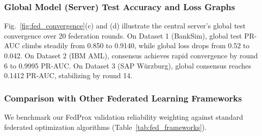 \documentclass[journal]{IEEEtran}
\begin{document}
\subsubsection{Global Model (Server) Test Accuracy and Loss Graphs}\label{sec:fed_server}
Fig.~\ref{fig:fed_convergence}(c) and (d) illustrate the central server's global test convergence over 20 federation rounds. On Dataset 1 (BankSim), global test PR-AUC climbs steadily from 0.850 to 0.9140, while global loss drops from 0.52 to 0.042. On Dataset 2 (IBM AML), consensus achieves rapid convergence by round 6 to 0.9995 PR-AUC. On Dataset 3 (SAP W{\"u}rzburg), global consensus reaches 0.1412 PR-AUC, stabilizing by round 14.

\subsubsection{Comparison with Other Federated Learning Frameworks}\label{sec:fed_comparison}
We benchmark our FedProx validation reliability weighting against standard federated optimization algorithms (Table~\ref{tab:fed_frameworks}).
\end{document}
